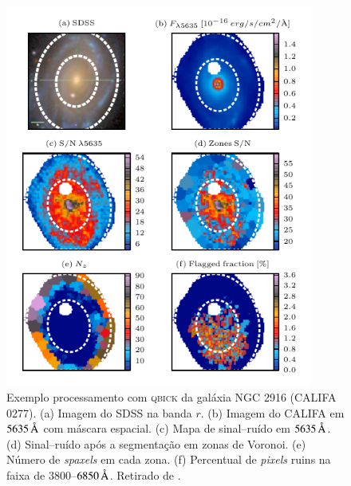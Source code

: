 \begin{figure}
	\includegraphics[width=0.9\textwidth]{figuras/zones-K0277}
	\caption[Exemplo processamento com \textsc{qbick}, galáxia K0277]
	{Exemplo processamento com \textsc{qbick} da galáxia NGC 2916 (CALIFA 0277). (a)
	Imagem do SDSS na banda $r$. (b) Imagem do CALIFA em $5635\,\text{\normalfont\AA}$ com máscara
	espacial. (c) Mapa de sinal--ruído em $5635\,\text{\normalfont\AA}$. (d) Sinal--ruído após
	a segmentação em zonas de Voronoi. (e) Número de {\em spaxels} em cada zona.
	(f) Percentual de {\em pixels} ruins na faixa de $3800$--$6850\,\text{\normalfont\AA}$.
	Retirado de \citet{CidFernandes2013}.}
	\label{fig:QBICK}
\end{figure}

\subsection{\starlight}
\label{sec:ifs:starlight}

